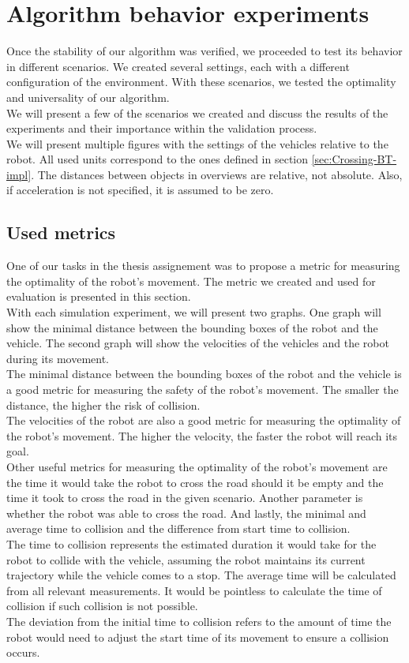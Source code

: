 \section{Algorithm behavior experiments}
    Once the stability of our algorithm was verified, we proceeded to test its behavior in different scenarios. We created several settings, each with a different configuration of the environment. With these scenarios, we tested the optimality and universality of our algorithm.\\
    We will present a few of the scenarios we created and discuss the results of the experiments and their importance within the validation process.\\
    We will present multiple figures with the settings of the vehicles relative to the robot. All used units correspond to the ones defined in section \ref{sec:Crossing-BT-impl}. The distances between objects in overviews are relative, not absolute. Also, if acceleration is not specified, it is assumed to be zero.\\
    \subsection{Used metrics}
    \label{sec:metrics}
        One of our tasks in the thesis assignement was to propose a metric for measuring the optimality of the robot's movement. The metric we created and used for evaluation is presented in this section.\\
        With each simulation experiment, we will present two graphs. One graph will show the minimal distance between the bounding boxes of the robot and the vehicle. The second graph will show the velocities of the vehicles and the robot during its movement.\\
        The minimal distance between the bounding boxes of the robot and the vehicle is a good metric for measuring the safety of the robot's movement. The smaller the distance, the higher the risk of collision.\\
        The velocities of the robot are also a good metric for measuring the optimality of the robot's movement. The higher the velocity, the faster the robot will reach its goal.\\
        Other useful metrics for measuring the optimality of the robot's movement are the time it would take the robot to cross the road should it be empty and the time it took to cross the road in the given scenario. Another parameter is whether the robot was able to cross the road. And lastly, the minimal and average time to collision and the difference from start time to collision.\\
        The time to collision represents the estimated duration it would take for the robot to collide with the vehicle, assuming the robot maintains its current trajectory while the vehicle comes to a stop. The average time will be calculated from all relevant measurements. It would be pointless to calculate the time of collision if such collision is not possible.\\
        The deviation from the initial time to collision refers to the amount of time the robot would need to adjust the start time of its movement to ensure a collision occurs.
